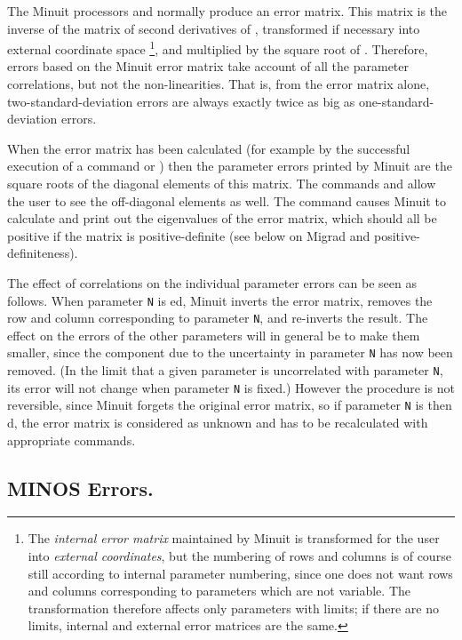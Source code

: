 The Minuit processors  and  
normally produce an error matrix.
This matrix is the inverse of the matrix of second derivatives of ,
transformed if necessary into external coordinate space%
\footnote{The {\it internal error matrix} maintained by Minuit is transformed
for the user into {\it external coordinates}, but the numbering
of rows and columns is of course still according to internal parameter
numbering, since one does not want rows and columns corresponding to
parameters which are not variable. The transformation therefore
affects only parameters with limits; if there are no limits, internal and
external error matrices are the same.},
and multiplied by the square root of .
Therefore, errors based on the Minuit error matrix take account of all the
parameter correlations, but not the non-linearities. That is, from the error
matrix alone, two-standard-deviation errors are always exactly twice as big
as one-standard-deviation errors.
 
When the error matrix has been calculated (for example by the successful
execution of a command  or ) then the parameter errors
printed by Minuit are the square roots of the diagonal elements of this
matrix. The commands  and 
allow the user to see the off-diagonal elements as well.
The command  causes Minuit to calculate and print
out the eigenvalues of the error matrix, which should all be
positive if the matrix is positive-definite (see below on Migrad and
positive-definiteness).
 
The effect of correlations on the individual parameter errors can be
seen as follows. When parameter \texttt{N} is ed, 
Minuit inverts the error
matrix, removes the row and column corresponding to parameter \texttt{N}, and
re-inverts the result. The effect on the errors of the other parameters
will in general be to make them smaller, since the component due to
the uncertainty in parameter \texttt{N} has now been removed. (In the limit
that a given parameter is uncorrelated with parameter \texttt{N}, its error will
not change when parameter \texttt{N} is fixed.)
However the procedure is not reversible, since Minuit forgets the
original error matrix, so if parameter \texttt{N} is then d, 
the error matrix is considered as unknown and has to be recalculated with
appropriate commands.

\subsection{MINOS Errors.}

